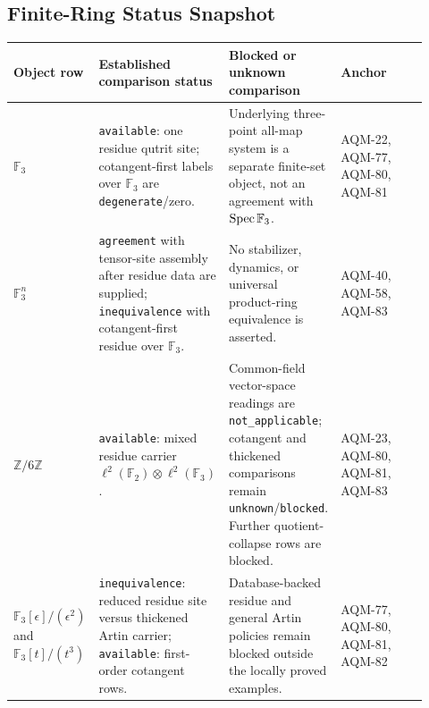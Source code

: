 \subsection{Finite-Ring Status Snapshot}

\begin{center}
\scriptsize\setlength{\tabcolsep}{3pt}
\begin{tabular}{p{0.19\linewidth}p{0.26\linewidth}p{0.25\linewidth}p{0.22\linewidth}}
\toprule
Object row & Established comparison status & Blocked or unknown comparison & Anchor \\
\midrule
\(\mathbb F_3\) &
\texttt{available}: one residue qutrit site; cotangent-first labels over
\(\mathbb F_3\) are \texttt{degenerate}/zero. &
Underlying three-point all-map system is a separate finite-set object, not an
agreement with \(\operatorname{Spec}\mathbb F_3\). &
AQM-22, AQM-77, AQM-80, AQM-81 \\
\addlinespace
\(\mathbb F_3^n\) &
\texttt{agreement} with tensor-site assembly after residue data are supplied;
\texttt{inequivalence} with cotangent-first residue over \(\mathbb F_3\). &
No stabilizer, dynamics, or universal product-ring equivalence is asserted. &
AQM-40, AQM-58, AQM-83 \\
\addlinespace
\(\mathbb Z/6\mathbb Z\) &
\texttt{available}: mixed residue carrier
\(\ell^2(\mathbb F_2)\otimes\ell^2(\mathbb F_3)\). &
Common-field vector-space readings are \texttt{not\_applicable};
cotangent and thickened comparisons remain \texttt{unknown}/\texttt{blocked}.
Further quotient-collapse rows are blocked. &
AQM-23, AQM-80, AQM-81, AQM-83 \\
\addlinespace
\(\mathbb F_3[\epsilon]/(\epsilon^2)\) and
\(\mathbb F_3[t]/(t^3)\) &
\texttt{inequivalence}: reduced residue site versus thickened Artin carrier;
\texttt{available}: first-order cotangent rows. &
Database-backed residue and general Artin policies remain blocked outside the
locally proved examples. &
AQM-77, AQM-80, AQM-81, AQM-82 \\
\bottomrule
\end{tabular}
\end{center}

